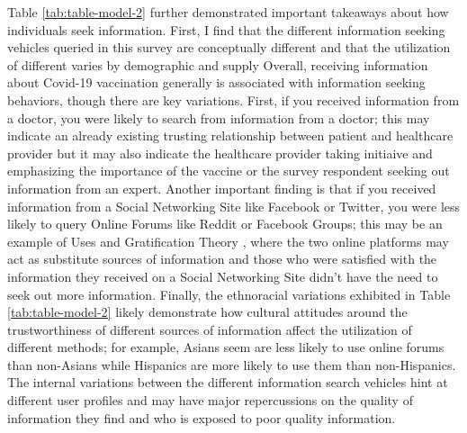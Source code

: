 Table \ref{tab:table-model-2} further demonstrated important takeaways about
how individuals seek information. First, I find that the different information
seeking vehicles queried in this survey are conceptually different and that the
utilization of different varies by demographic and supply 
Overall, receiving information about
Covid-19 vaccination generally is associated with information seeking behaviors,
though there are key variations. First, if you received information from a
doctor, you were likely to search from information from a doctor; this may
indicate an already existing trusting relationship between patient and
healthcare provider but it may also indicate the healthcare provider taking
initiaive and emphasizing the importance of the vaccine or the survey respondent
seeking out information from an expert. Another important finding is that if you
received information from a Social Networking Site like Facebook or Twitter, you
were less likely to query Online Forums like Reddit or Facebook Groups; this may
be an example of Uses and Gratification Theory
\citep{blumlerUsesMassCommunications1974}, where the two online platforms may act as
substitute sources of information and those who were satisfied with the
information they received on a Social Networking Site didn't have the need to
seek out more information. Finally, the ethnoracial variations exhibited in
Table \ref{tab:table-model-2} likely demonstrate how cultural attitudes around
the trustworthiness of different sources of information affect the utilization
of different methods; for example, Asians seem are less likely to use online
forums than non-Asians while Hispanics are more likely to use them than
non-Hispanics. The internal variations between the different information search
vehicles hint at different user profiles and may have major repercussions on the
quality of information they find and who is exposed to poor quality information.

